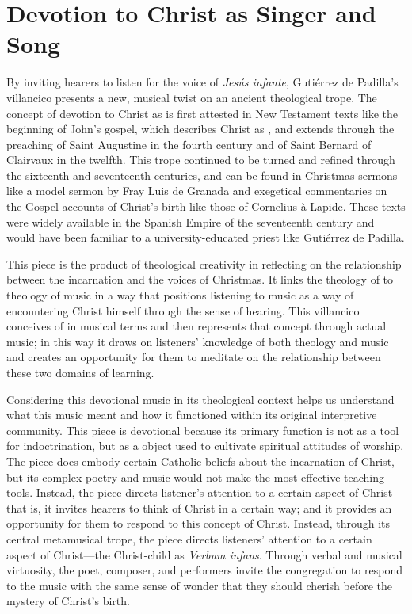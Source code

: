 \section{Devotion to Christ as Singer and Song}

By inviting hearers to listen for the voice of \emph{Jesús infante}, Gutiérrez
de Padilla's villancico presents a new, musical twist on an ancient theological
trope.
The concept of devotion to Christ as  is first attested
in New Testament texts like the beginning of John's gospel, which describes
Christ as , and extends through the preaching of
Saint Augustine in the fourth century and of Saint Bernard of Clairvaux in the
twelfth.
This trope continued to be turned and refined through the sixteenth and
seventeenth centuries, and can be found in Christmas sermons like a model sermon
by Fray Luis de Granada and exegetical commentaries on the Gospel accounts of
Christ's birth like those of Cornelius à Lapide.
These texts were widely available in the Spanish Empire of the seventeenth
century and would have been familiar to a university-educated priest like
Gutiérrez de Padilla.

This piece is the product of theological creativity in reflecting on the
relationship between the incarnation and the voices of Christmas. 
It links the theology of  to theology of music in a way that
positions listening to music as a way of encountering Christ himself through the
sense of hearing.
This villancico conceives of  in musical terms and then
represents that concept through actual music; in this way it draws on listeners'
knowledge of both theology and music and creates an opportunity for them to
meditate on the relationship between these two domains of learning.

Considering this devotional music in its theological context helps us understand
what this music meant and how it functioned within its original interpretive
community.
This piece is devotional because its primary function is not as a tool for
indoctrination, but as a object used to cultivate spiritual attitudes of
worship.
The piece does embody certain Catholic beliefs about the incarnation of Christ,
but its complex poetry and music would not make the most effective teaching
tools.
Instead, the piece directs listener's attention to a certain aspect of
Christ---that is, it invites hearers to think of Christ in a certain way; and it
provides an opportunity for them to respond to this concept of Christ.
Instead, through its central metamusical trope, the piece directs listeners'
attention to a certain aspect of Christ---the Christ-child as \emph{Verbum
infans}.
Through verbal and musical virtuosity, the poet, composer, and performers invite
the congregation to respond to the music with the same sense of wonder that they
should cherish before the mystery of Christ's birth.


